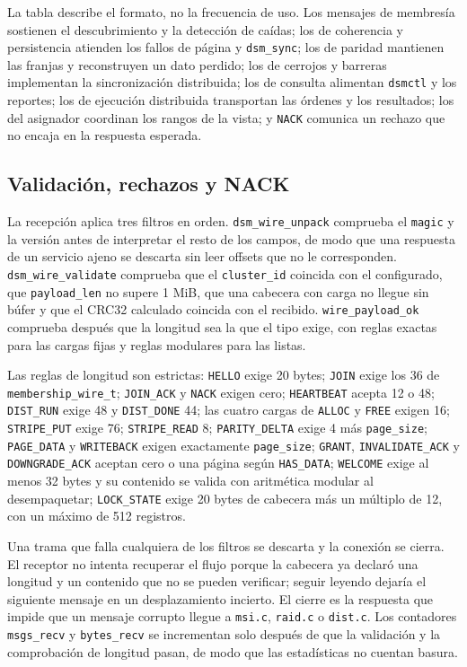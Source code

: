 La tabla describe el formato, no la frecuencia de uso. Los mensajes de membresía sostienen el descubrimiento y la detección de caídas; los de coherencia y persistencia atienden los fallos de página y \texttt{dsm\_sync}; los de paridad mantienen las franjas y reconstruyen un dato perdido; los de cerrojos y barreras implementan la sincronización distribuida; los de consulta alimentan \texttt{dsmctl} y los reportes; los de ejecución distribuida transportan las órdenes y los resultados; los del asignador coordinan los rangos de la vista; y \texttt{NACK} comunica un rechazo que no encaja en la respuesta esperada.

\subsection{Validación, rechazos y NACK}

La recepción aplica tres filtros en orden. \texttt{dsm\_wire\_unpack} comprueba el \texttt{magic} y la versión antes de interpretar el resto de los campos, de modo que una respuesta de un servicio ajeno se descarta sin leer offsets que no le corresponden. \texttt{dsm\_wire\_validate} comprueba que el \texttt{cluster\_id} coincida con el configurado, que \texttt{payload\_len} no supere 1 MiB, que una cabecera con carga no llegue sin búfer y que el CRC32 calculado coincida con el recibido. \texttt{wire\_payload\_ok} comprueba después que la longitud sea la que el tipo exige, con reglas exactas para las cargas fijas y reglas modulares para las listas.

Las reglas de longitud son estrictas: \texttt{HELLO} exige 20 bytes; \texttt{JOIN} exige los 36 de \texttt{membership\_wire\_t}; \texttt{JOIN\_ACK} y \texttt{NACK} exigen cero; \texttt{HEARTBEAT} acepta 12 o 48; \texttt{DIST\_RUN} exige 48 y \texttt{DIST\_DONE} 44; las cuatro cargas de \texttt{ALLOC} y \texttt{FREE} exigen 16; \texttt{STRIPE\_PUT} exige 76; \texttt{STRIPE\_READ} 8; \texttt{PARITY\_DELTA} exige 4 más \texttt{page\_size}; \texttt{PAGE\_DATA} y \texttt{WRITEBACK} exigen exactamente \texttt{page\_size}; \texttt{GRANT}, \texttt{INVALIDATE\_ACK} y \texttt{DOWNGRADE\_ACK} aceptan cero o una página según \texttt{HAS\_DATA}; \texttt{WELCOME} exige al menos 32 bytes y su contenido se valida con aritmética modular al desempaquetar; \texttt{LOCK\_STATE} exige 20 bytes de cabecera más un múltiplo de 12, con un máximo de 512 registros.

Una trama que falla cualquiera de los filtros se descarta y la conexión se cierra. El receptor no intenta recuperar el flujo porque la cabecera ya declaró una longitud y un contenido que no se pueden verificar; seguir leyendo dejaría el siguiente mensaje en un desplazamiento incierto. El cierre es la respuesta que impide que un mensaje corrupto llegue a \texttt{msi.c}, \texttt{raid.c} o \texttt{dist.c}. Los contadores \texttt{msgs\_recv} y \texttt{bytes\_recv} se incrementan solo después de que la validación y la comprobación de longitud pasan, de modo que las estadísticas no cuentan basura.

